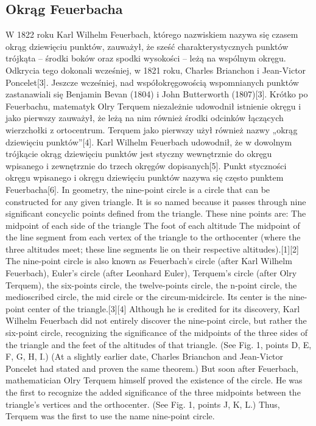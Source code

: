 \subsection{Okrąg Feuerbacha}
W 1822 roku Karl Wilhelm Feuerbach, którego nazwiskiem nazywa się czasem okrąg dziewięciu punktów, zauważył, że sześć charakterystycznych punktów trójkąta – środki boków oraz spodki wysokości – leżą na wspólnym okręgu. Odkrycia tego dokonali wcześniej, w 1821 roku, Charles Brianchon i Jean-Victor Poncelet[3]. Jeszcze wcześniej, nad współokręgowością wspomnianych punktów zastanawiali się Benjamin Bevan (1804) i John Butterworth (1807)[3].
Krótko po Feuerbachu, matematyk Olry Terquem niezależnie udowodnił istnienie okręgu i jako pierwszy zauważył, że leżą na nim również środki odcinków łączących wierzchołki z ortocentrum. Terquem jako pierwszy użył również nazwy „okrąg dziewięciu punktów”[4].
Karl Wilhelm Feuerbach udowodnił, że w dowolnym trójkącie okrąg dziewięciu punktów jest styczny wewnętrznie do okręgu wpisanego i zewnętrznie do trzech okręgów dopisanych[5]. Punkt styczności okręgu wpisanego i okręgu dziewięciu punktów nazywa się często punktem Feuerbacha[6].
In geometry, the nine-point circle is a circle that can be constructed for any given triangle. It is so named because it passes through nine significant concyclic points defined from the triangle. These nine points are:
The midpoint of each side of the triangle
The foot of each altitude
The midpoint of the line segment from each vertex of the triangle to the orthocenter (where the three altitudes meet; these line segments lie on their respective altitudes).[1][2]
The nine-point circle is also known as Feuerbach's circle (after Karl Wilhelm Feuerbach), Euler's circle (after Leonhard Euler), Terquem's circle (after Olry Terquem), the six-points circle, the twelve-points circle, the n-point circle, the medioscribed circle, the mid circle or the circum-midcircle. Its center is the nine-point center of the triangle.[3][4]
Although he is credited for its discovery, Karl Wilhelm Feuerbach did not entirely discover the nine-point circle, but rather the six-point circle, recognizing the significance of the midpoints of the three sides of the triangle and the feet of the altitudes of that triangle. (See Fig. 1, points D, E, F, G, H, I.) (At a slightly earlier date, Charles Brianchon and Jean-Victor Poncelet had stated and proven the same theorem.) But soon after Feuerbach, mathematician Olry Terquem himself proved the existence of the circle. He was the first to recognize the added significance of the three midpoints between the triangle's vertices and the orthocenter. (See Fig. 1, points J, K, L.) Thus, Terquem was the first to use the name nine-point circle.
